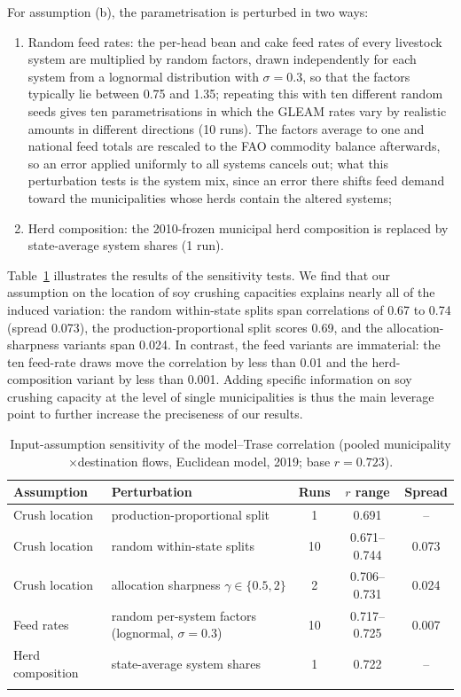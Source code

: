 \documentclass[pdflatex,sn-nature]{sn-jnl}%
\begin{document}
For assumption (b), the parametrisation is perturbed in two ways:
\begin{enumerate}
\item Random feed rates: the per-head bean and cake feed rates of every
livestock system are multiplied by random factors, drawn independently
for each system from a lognormal distribution with $\sigma=0.3$, so
that the factors typically lie between 0.75 and 1.35; repeating this
with ten different random seeds gives ten
parametrisations in which the GLEAM rates vary by realistic
amounts in different directions (10 runs). The factors average to one
and national feed totals are rescaled to the FAO commodity balance
afterwards, so an error applied uniformly to all systems cancels
out; what this perturbation tests is the system mix, since an error
there shifts feed demand toward the municipalities whose herds contain
the altered systems;
\item Herd composition: the 2010-frozen municipal herd composition is
replaced by state-average system shares (1 run).
\end{enumerate}

Table~\ref{tab:val-inputs} illustrates the results of the sensitivity tests.
We find that our assumption on the location of soy crushing capacities explains nearly all of the induced variation: the
random within-state splits span correlations of 0.67 to 0.74 (spread
0.073), the production-proportional split scores 0.69, and the
allocation-sharpness variants span 0.024. In contrast, the feed variants are
immaterial: the ten feed-rate draws move the correlation by less than
0.01 and the herd-composition variant by less than 0.001. Adding specific information on soy crushing capacity at the level of single municipalities is thus the main leverage point to further increase the preciseness of our results.

\begin{table}[htbp]
\caption{Input-assumption sensitivity of the model--Trase correlation
(pooled municipality$\times$destination flows, Euclidean model, 2019;
base $r=0.723$).}\label{tab:val-inputs}
\begin{tabular}{@{}llccc@{}}
\toprule
Assumption & Perturbation & Runs & $r$ range & Spread \\
\midrule
Crush location & production-proportional split & 1 & 0.691 & -- \\
Crush location & random within-state splits & 10 & 0.671--0.744 & 0.073 \\
Crush location & allocation sharpness $\gamma\in\{0.5,2\}$ & 2 & 0.706--0.731 & 0.024 \\
Feed rates & random per-system factors (lognormal, $\sigma=0.3$) & 10 & 0.717--0.725 & 0.007 \\
Herd composition & state-average system shares & 1 & 0.722 & -- \\
\botrule
\end{tabular}
\end{table}
\end{document}
